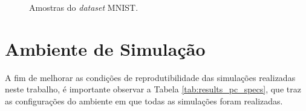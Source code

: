 \begin{figure}[H]
    \hspace{0.1cm}
    \hspace{0.1cm}
    \caption{Amostras do \textit{dataset} MNIST.}
    \label{fig:datasets_mnist}
\end{figure}



\section{Ambiente de Simulação}
\label{sec:results_simulation_environment}

A fim de melhorar as condições de reprodutibilidade das simulações realizadas neste trabalho, é importante observar a Tabela \ref{tab:results_pc_specs}, que traz as configurações do ambiente em que todas as simulações foram realizadas.

